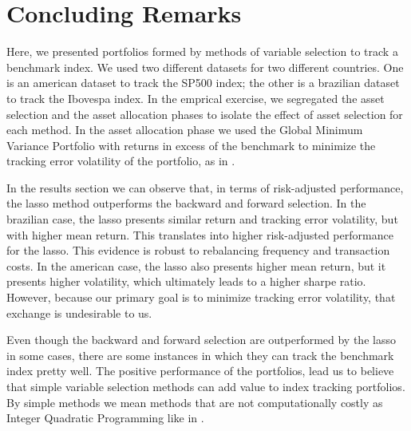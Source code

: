 \documentclass[preprint, doubleblind, authoryear,10pt]{elsarticle}
\begin{document}
\section{Concluding Remarks} \label{sec:conc}

Here, we presented portfolios formed by methods of variable selection to track a benchmark index.
We used two different datasets for two different countries.
One is an american dataset to track the SP500 index; the other is a brazilian dataset to track the Ibovespa index.
In the emprical exercise, we segregated the asset selection and the asset allocation phases to isolate the effect of asset selection for each method.
In the asset allocation phase we used the Global Minimum Variance Portfolio with returns in excess of the benchmark to minimize the tracking error volatility of the portfolio, as in \cite{liu-2009}.

In the results section we can observe that, in terms of risk-adjusted performance, the lasso method outperforms the backward and forward selection. 
In the brazilian case, the lasso presents similar return and tracking error volatility, but with higher mean return.
This translates into higher risk-adjusted performance for the lasso.
This evidence is robust to rebalancing frequency and transaction costs.
In the american case, the lasso also presents higher mean return, but it presents higher volatility, which ultimately leads to a higher sharpe ratio.
However, because our primary goal is to minimize tracking error volatility, that exchange is undesirable to us.

Even though the backward and forward selection are outperformed by the lasso in some cases, there are some instances in which they can track the benchmark index pretty well.
The positive performance of the portfolios, lead us to believe that simple variable selection methods can add value to index tracking portfolios.
By simple methods we mean methods that are not computationally costly as Integer Quadratic Programming like in \cite{santos15,rbfin-it}.

\singlespacing

\clearpage




\end{document}
